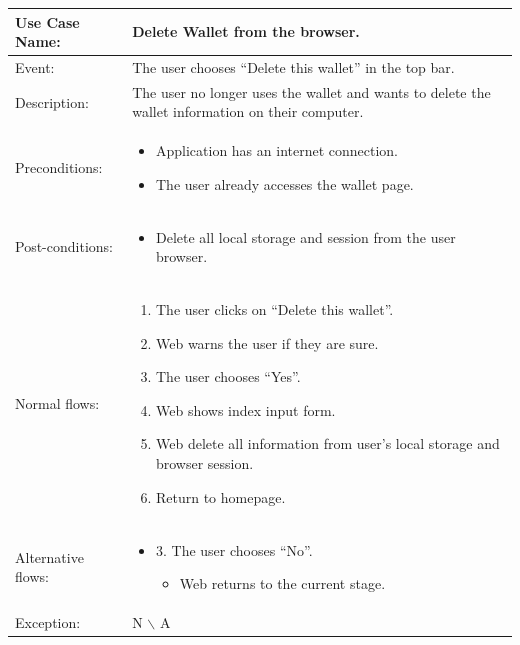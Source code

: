 \begin{table}[]
    \begin{tabular}{| m{4cm} | m{11cm} |}
        \hline
        Use Case Name:     & Delete Wallet from the browser.                                                                  \\ \hline
        Event:             & The user chooses “Delete this wallet” in the top bar.                                            \\ \hline
        Description:       & The user no longer uses the wallet and wants to delete the wallet information on their computer. \\ \hline
        Preconditions:     & \begin{itemize}
            \item Application has an internet connection.
            \item The user already accesses the wallet page.
        \end{itemize}                                                                       \\ \hline
        Post-conditions:   & \begin{itemize}
            \item Delete all local storage and session from the user browser.
        \end{itemize}                                                                       \\ \hline
        Normal flows:      & \begin{enumerate}
            \item The user clicks on “Delete this wallet”.
            \item Web warns the user if they are sure.
            \item The user chooses “Yes”.
            \item Web shows index input form.
            \item Web delete all information from user's local storage and browser session.
            \item Return to homepage.
        \end{enumerate}                                                                       \\ \hline
        Alternative flows: & \begin{itemize}
            \item {3. The user chooses “No”.}
                  \begin{itemize}
                      \item Web returns to the current stage.
                  \end{itemize}
        \end{itemize}                                                                       \\ \hline
        Exception:         & N $\backslash$ A                                                                                 \\ \hline
    \end{tabular}
\end{table}


